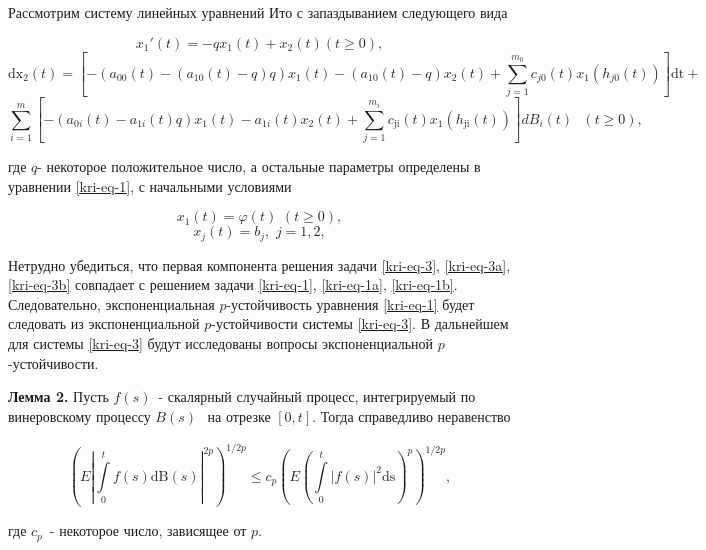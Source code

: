 Рассмотрим систему линейных уравнений Ито с запаздыванием следующего вида

\begin{equation*}
	x_1'(t)=-qx_1(t)+x_2(t)(t\ge 0),
\end{equation*}
\begin{equation}\label{kri-eq-3}
	\text{dx}_2(t)=\left[-(a_{00}(t)-(a_{10}(t)-q)q)x_1(t)-(a_{10}(t)-q)x_2(t)+\overset{m_0}{\underset{j=1}{\sum
	}}c_{\mathit{j0}}(t)x_1(h_{\mathit{j0}}(t))\right]\text{dt}+
\end{equation}
\begin{equation*}
\overset
	m{\underset{i=1}{\sum }}\left[-(a_{0i}(t)-a_{1i}(t)q)x_1(t)-a_{1i}(t)x_2(t)+\overset{m_i}{\underset{j=1}{\sum
	}}c_{\text{ji}}(t)x_1(h_{\text{ji}}(t))\right]\mathit{dB}_i(t)\text{  }(t\ge
	0),
\end{equation*}

где  $q${}- некоторое положительное число, а остальные параметры
определены в уравнении \eqref{kri-eq-1}, с начальными условиями

\begin{equation}\label{kri-eq-3a}
	x_1(t)=\varphi (t)\text{
	}(t\ge
	0),
\end{equation}
\begin{equation}\label{kri-eq-3b}
	x_j(t)=b_j,\text{
	}j=1,2,
\end{equation}

Нетрудно убедиться, что первая компонента решения задачи \eqref{kri-eq-3}, \eqref{kri-eq-3a}, \eqref{kri-eq-3b} совпадает с решением задачи \eqref{kri-eq-1}, \eqref{kri-eq-1a}, \eqref{kri-eq-1b}.
Следовательно, экспоненциальная  $p${}-устойчивость уравнения \eqref{kri-eq-1} будет следовать из экспоненциальной
$p${}-устойчивости системы \eqref{kri-eq-3}. В дальнейшем для системы \eqref{kri-eq-3} будут исследованы вопросы экспоненциальной
$p${}-устойчивости.


\textbf{Лемма 2.} Пусть  $f(s)$\ {}- скалярный случайный процесс, интегрируемый по винеровскому процессу  $B(s)$
\textsubscript{\ }на отрезке  $[0,t]$. Тогда справедливо неравенство

\begin{equation}\label{kri-eq-4}
	\left(E|\overset t{\underset 0{\int }}f(s)\text{dB}(s)|^{2p}\right)^{1/2p}\le
	c_p\left(E\left(\overset t{\underset 0{\int
	}}|f(s)|^2\text{ds}\right)^p\right)^{1/2p},
\end{equation}


где  $c_p$\ {}- некоторое число, зависящее от  $p$.

